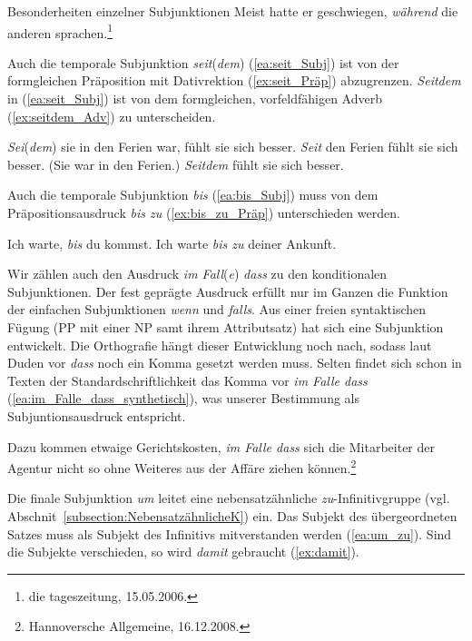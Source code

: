 \begin{Exkurs}{Besonderheiten einzelner Subjunktionen}
\ea \label{ea:während_temp_adv} Meist hatte er geschwiegen, \textit{während} die anderen sprachen.\footnote{die tageszeitung, 15.05.2006.}
\z 


Auch die temporale Subjunktion \textit{seit}(\textit{dem}) (\ref{ea:seit_Subj}) ist von der formgleichen Präposition mit Dativrektion (\ref{ex:seit_Präp}) abzugrenzen. \textit{Seitdem} in (\ref{ea:seit_Subj}) ist von dem formgleichen, vorfeldfähigen Adverb (\ref{ex:seitdem_Adv}) zu unterscheiden.

\ea \label{ea:seit_Konj_Präp}
\ea \label{ea:seit_Subj} \textit{Sei}(\textit{dem}) sie in den Ferien war, fühlt sie sich besser.
\ex \label{ex:seit_Präp} \textit{Seit} den Ferien fühlt sie sich besser.
\ex \label{ex:seitdem_Adv} (Sie war in den Ferien.) \textit{Seitdem} fühlt sie sich besser.
\z 
\z 

\newpage
Auch die temporale Subjunktion \textit{bis} (\ref{ea:bis_Subj}) muss von dem Präpositionsausdruck \textit{bis zu} (\ref{ex:bis_zu_Präp}) unterschieden werden.

\ea \label{ea:bis_bis_zu_Subj_Präp}
\ea \label{ea:bis_Subj} Ich warte, \textit{bis} du kommst.
\ex \label{ex:bis_zu_Präp} Ich warte \textit{bis zu} deiner Ankunft.
\z 
\z 


Wir zählen auch den Ausdruck \textit{im Fall}(\textit{e}) \textit{dass} zu den konditionalen Subjunktionen. Der fest geprägte Ausdruck erfüllt nur im Ganzen die Funktion der einfachen Subjunktionen \textit{wenn} und \textit{falls}. Aus einer freien syntaktischen Fügung (PP mit einer NP samt ihrem Attributsatz) hat sich eine Subjunktion entwickelt. Die Orthografie hängt dieser Entwicklung noch nach, sodass laut Duden vor \textit{dass} noch ein Komma gesetzt werden muss. Selten findet sich schon in Texten der Standardschriftlichkeit das Komma vor \textit{im Falle dass} (\ref{ea:im_Falle_dass_synthetisch}), was unserer Bestimmung als Subjuntionsausdruck entspricht.


\ea \label{ea:im_Falle_dass_synthetisch} Dazu kommen etwaige Gerichtskosten, \textit{im Falle dass} sich die Mitarbeiter der Agentur nicht so ohne Weiteres aus der Affäre ziehen können.\footnote{Hannoversche Allgemeine, 16.12.2008.}
\z 

Die finale Subjunktion \textit{um} leitet eine nebensatzähnliche \textit{zu}-Infinitivgruppe (vgl. Abschnit~\ref{subsection:NebensatzähnlicheK}) ein. Das Subjekt des übergeordneten Satzes muss als Subjekt des Infinitivs mitverstanden werden (\ref{ea:um_zu}). Sind die Subjekte verschieden, so wird \textit{damit} gebraucht (\ref{ex:damit}).


\end{Exkurs}
